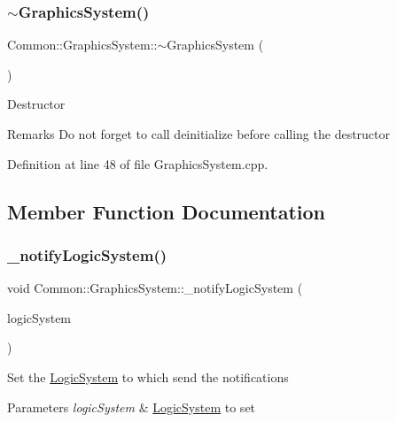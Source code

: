 \subsubsection{\texorpdfstring{$\sim$\+Graphics\+System()}{~GraphicsSystem()}}
{\footnotesize\ttfamily Common\+::\+Graphics\+System\+::$\sim$\+Graphics\+System (\begin{DoxyParamCaption}{ }\end{DoxyParamCaption})\hspace{0.3cm}{\ttfamily [virtual]}}

Destructor \begin{DoxyRemark}{Remarks}
Do not forget to call deinitialize before calling the destructor 
\end{DoxyRemark}


Definition at line 48 of file Graphics\+System.\+cpp.



\subsection{Member Function Documentation}
\mbox{\label{class_common_1_1_graphics_system_a1bbb04c3ab640d4753f852d17a419df0}} 
\subsubsection{\texorpdfstring{\+\_\+notify\+Logic\+System()}{\_notifyLogicSystem()}}
{\footnotesize\ttfamily void Common\+::\+Graphics\+System\+::\+\_\+notify\+Logic\+System (\begin{DoxyParamCaption}\item[{\hyperlink{class_common_1_1_base_system}{Base\+System} $\ast$}]{logic\+System }\end{DoxyParamCaption})\hspace{0.3cm}{\ttfamily [inline]}}

Set the \hyperlink{class_common_1_1_logic_system}{Logic\+System} to which send the notifications 
\begin{DoxyParams}{Parameters}
{\em logic\+System} & \hyperlink{class_common_1_1_logic_system}{Logic\+System} to set \\
\hline
\end{DoxyParams}


